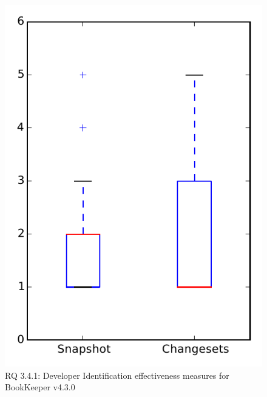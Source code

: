 
\begin{figure}
\centering
\includegraphics[height=0.4\textheight]{figures/dit/rq1_bookkeeper}
\caption{RQ 3.4.1: Developer Identification effectiveness measures for BookKeeper v4.3.0}
\label{fig:dit:rq1:bookkeeper}
\end{figure}
